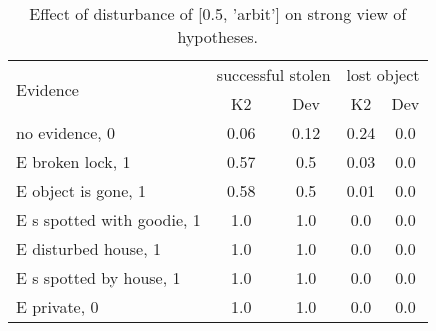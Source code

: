 \begin{table}\begin{tabular}{l|cc|cc}\toprule\multirow{2}{*}{Evidence} & \multicolumn{2}{c}{successful stolen}& \multicolumn{2}{c}{lost object}\\& {K2} & {Dev}& {K2} & {Dev}\\\midrule
no evidence, 0 & \cellcolor{Bittersweet}0.06&\cellcolor{Bittersweet}0.12&\cellcolor{Bittersweet}0.24&\cellcolor{Bittersweet}0.0\\E broken lock, 1 & \cellcolor{Bittersweet}0.57&\cellcolor{Bittersweet}0.5&0.03&0.0\\E object is gone, 1 & \cellcolor{Bittersweet}0.58&\cellcolor{Bittersweet}0.5&0.01&0.0\\E s spotted with goodie, 1 & 1.0&1.0&0.0&0.0\\E disturbed house, 1 & 1.0&1.0&0.0&0.0\\E s spotted by house, 1 & 1.0&1.0&0.0&0.0\\E private, 0 & 1.0&1.0&0.0&0.0\\\bottomrule\end{tabular}\caption{Effect of disturbance of [0.5, 'arbit'] on strong view of hypotheses.}\end{table}